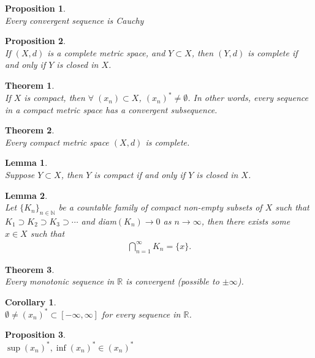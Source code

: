 \documentclass[10pt,a4paper]{article}
\newtheorem{theorem}{Theorem}
\newtheorem{lemma}{Lemma}
\newtheorem{proposition}{Proposition}
\newtheorem{corollary}{Corollary}
\theoremstyle{definition}
\theoremstyle{definition}
\numberwithin{equation}{section}
\numberwithin{theorem}{section}
\numberwithin{proposition}{section}
\numberwithin{lemma}{section}
\numberwithin{corollary}{section}
\begin{document}
\begin{proposition}$ $
\\Every convergent sequence is Cauchy
\end{proposition}

\begin{proposition}$ $
\\If $(X, d)$ is a complete metric space, and $Y \subset X$, then $(Y, d)$ is complete if and only if $Y$ is closed in $X$.
\end{proposition}

\begin{theorem}$ $
\\If $X$ is compact, then $\forall \; (x_n) \subset X$, $(x_n)^* \neq \emptyset$. In other words, every sequence in a compact metric space has a convergent subsequence. 
\end{theorem}

\begin{theorem}$ $
\\Every compact metric space $(X, d)$ is complete.
\end{theorem}

\begin{lemma}$ $
\\Suppose $Y \subset X$, then $Y$ is compact if and only if $Y$ is closed in $X$.
\end{lemma}

\begin{lemma}$ $
\\Let $\{K_n\}_{n \in \mathbb{N}}$ be a countable family of compact non-empty subsets of $X$ such that $K_1 \supset K_2 \supset K_3 \supset \cdots $ and diam$(K_n) \to 0$ as $n \to \infty$, then there exists some $x \in X$ such that 
\begin{align*}
\bigcap_{n = 1}^\infty K_n = \{x\}.
\end{align*}
\end{lemma}

\begin{theorem}$ $
\\Every monotonic sequence in $\mathbb{R}$ is convergent (possible to $\pm \infty$). 
\end{theorem}

\begin{corollary}$ $
\\$\emptyset \neq (x_n)^* \subset [-\infty, \infty]$ for every sequence in $\mathbb{R}$. 
\end{corollary}

\begin{proposition}$ $
\\$\sup(x_n)^*, \inf(x_n)^* \in (x_n)^*$
\end{proposition}
\end{document}
